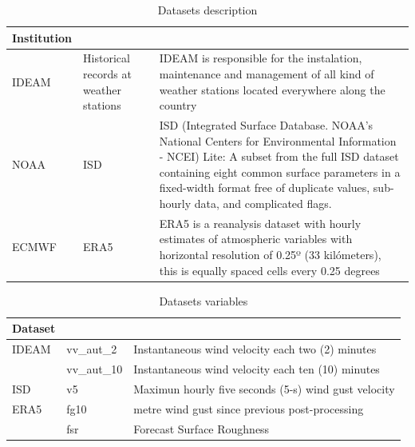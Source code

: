 \documentclass[12pt,oneside]{reedthesis}
\begin{document}
\begingroup\fontsize{10}{12}\selectfont
\begin{longtable}[t]{l>{\raggedright\arraybackslash}p{0.8in}>{\raggedright\arraybackslash}p{4in}}
\caption[Datasets Description]{\label{tab:tabledatasources1}Datasets description}\\
\toprule
\multicolumn{1}{l}{Institution} & \multicolumn{1}{l}{Dataset} & \multicolumn{1}{l}{Details}\\
\midrule
IDEAM & Historical records at weather stations & IDEAM is responsible for the instalation, maintenance and management of all kind of weather stations located everywhere along the country\\
NOAA & ISD & ISD (Integrated Surface Database. NOAA's National Centers for Environmental Information - NCEI) Lite: A subset from the full ISD dataset containing eight common surface parameters in a fixed-width format free of duplicate values, sub-hourly data, and complicated flags.\\
ECMWF & ERA5 & ERA5 is a reanalysis dataset with hourly estimates of atmospheric variables with horizontal resolution of 0.25º (33 kilómeters), this is equally spaced cells every 0.25 degrees\\
\bottomrule
\end{longtable}
\endgroup{}

\begingroup\fontsize{10}{12}\selectfont
\begin{longtable}[t]{l>{\raggedright\arraybackslash}p{1.2in}>{\raggedright\arraybackslash}p{3.5in}}
\caption[Datasets Variables]{\label{tab:tabledatasources2}Datasets variables}\\
\toprule
\multicolumn{1}{l}{Dataset} & \multicolumn{1}{l}{Variables} & \multicolumn{1}{l}{Description}\\
\midrule
IDEAM & vv\_aut\_2 & Instantaneous wind velocity each two (2) minutes\\
 & vv\_aut\_10 & Instantaneous wind velocity each ten (10) minutes\\
ISD & v5 & Maximun hourly five seconds (5-s) wind gust velocity\\
ERA5 & fg10 & 10 metre wind gust since previous post-processing\\
 & fsr & Forecast Surface Roughness\\
\bottomrule
\end{longtable}
\endgroup{}
\end{document}
